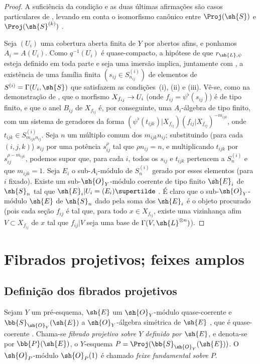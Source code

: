 \documentclass[oneside,10pt]{amsart}
\makeatletter
\newcommand{\ega@arrow}[2]{\mathchoice{#1}{#2}{#2}{#2}}
\renewcommand{\to}{\ega@arrow{\longrightarrow}{\rightarrow}}
\newcommand{\oldpage}[2][]{\marginnote{\normalfont\footnotesize\textbf{#1}~|~#2}\ignorespaces}
\let\EGAOriginalLabel\label
\renewcommand{\label}[1]{\phantomsection\EGAOriginalLabel{#1}}
\makeatother
\begin{document}
\begin{proof}
A suficiência da condição e as duas últimas afirmações são casos particulares de , levando em conta o isomorfismo canônico entre $\Proj(\sh{S})$ e $\Proj(\sh{S}^{(k)})$ .

Seja $(U_i)$ uma cobertura aberta finita de $Y$ por abertos afins, e ponhamos $A_i=A(U_i)$.
Como $q^{-1}(U_i)$ é quase-compacto, a hipótese de que $r_{\sh{L},\psi}$ esteja definido em toda parte e seja uma imersão implica, juntamente com , a existência de uma família finita $(s_{ij}\in S_{n_{ij}}^{(i)})$ de elementos de $S^{(i)}=\Gamma(U_i,\sh{S})$ que satisfazem as condições~(i), (ii) e (iii).
Vê-se, como na demonstração de , que o morfismo $X_{f_{ij}}\to U_i$ (onde $f_{ij}=\psi^\flat(s_{ij})$) é de tipo finito, e que o anel $B_{ij}$ de $X_{f_{ij}}$ é, por conseguinte, uma $A_i$-álgebra de tipo finito, com um sistema de geradores da forma $(\psi^\flat(t_{ijk})|X_{f_{ij}})(f_{ij}|X_{f_{ij}})^{-m_{ijk}}$, onde $t_{ijk}\in S_{m_{ijk}n_{ij}}^{(i)}$.
Seja $n$ um múltiplo comum dos $m_{ijk}n_{ij}$;
substituindo (para cada $(i,j,k)$) $s_{ij}$ por uma potência $s_{ij}^\rho$ tal que $\rho n_{ij}=n$, e multiplicando $t_{ijk}$ por $s_{ij}^{\rho-m_{ijk}}$, podemos supor que, para cada $i$, todos os $s_{ij}$ e $t_{ijk}$ pertencem a $S_n^{(i)}$ e que $m_{ijk}=1$.
Seja $E_i$ o sub-$A_i$-módulo de $S_n^{(i)}$ gerado por esses elementos (para $i$ fixado).
Existe um sub-$\sh{O}_Y$-módulo coerente de tipo finito $\sh{E}_i$ de $\sh{S}_n$ tal que $\sh{E}_i|U_i=(E_i)\supertilde$ .
\oldpage[II]{71}
É claro que o sub-$\sh{O}_Y$-módulo $\sh{E}$ de $\sh{S}_n$ dado pela soma dos $\sh{E}_i$ é o objeto procurado (pois cada seção $f_{ij}$ é tal que, para todo $x\in X_{f_{ij}}$, existe uma vizinhança afim $V\subset X_{f_{ij}}$ de $x$ tal que $f_{ij}|V$ seja uma base de $\Gamma(V,\sh{L}^{\otimes n})$).
\end{proof}

\section{Fibrados projetivos; feixes amplos}
\label{section:II.4}


\subsection{Definição dos fibrados projetivos}
\label{subsection:II.4.1}

\begin{definition}[4.1.1]
\label{II.4.1.1}
Sejam $Y$ um pré-esquema, $\sh{E}$ um $\sh{O}_Y$-módulo quase-coerente e $\bb{S}_{\sh{O}_Y}(\sh{E})$ a $\sh{O}_Y$-álgebra simétrica de $\sh{E}$ , que é quase-coerente .
Chama-se \emph{fibrado projetivo sobre $Y$ definido por $\sh{E}$}, e denota-se por $\bb{P}(\sh{E})$, o $Y$-esquema $P=\Proj(\bb{S}_{\sh{O}_Y}(\sh{E}))$.
O $\sh{O}_P$-módulo $\sh{O}_P(1)$ é chamado \emph{feixe fundamental sobre $P$}.
\end{definition}
\end{document}
